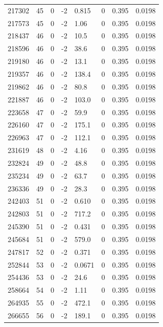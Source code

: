\documentclass[preview]{standalone}
\begin{document}
{{{{{{{{{\begin{tabular}{L{1.2cm}C{1.2cm} C{0.3cm}C{0.5cm} C{1.4cm}C{1.4cm} C{1.4cm}C{1.4cm}}
  217302  &    45  & 0     & -2 &  0.815  & 0  & 0.395 &  0.0198   \\ 
  217573  &    45  & 0     & -2 &  1.06  & 0  & 0.395 &  0.0198   \\ 
  218437  &    46  & 0     & -2 &  10.5  & 0  & 0.395 &  0.0198   \\ 
  218596  &    46  & 0     & -2 &  38.6  & 0  & 0.395 &  0.0198   \\ 
  219180  &    46  & 0     & -2 &  13.1  & 0  & 0.395 &  0.0198   \\ 
  219357  &    46  & 0     & -2 &  138.4  & 0  & 0.395 &  0.0198   \\ 
  219862  &    46  & 0     & -2 &  80.8  & 0  & 0.395 &  0.0198   \\ 
  221887  &    46  & 0     & -2 &  103.0  & 0  & 0.395 &  0.0198   \\ 
  223658  &    47  & 0     & -2 &  59.9  & 0  & 0.395 &  0.0198   \\ 
  226160  &    47  & 0     & -2 &  175.1  & 0  & 0.395 &  0.0198   \\ 
  226963  &    47  & 0     & -2 &  112.1  & 0  & 0.395 &  0.0198   \\ 
  231619  &    48  & 0     & -2 &  4.16  & 0  & 0.395 &  0.0198   \\ 
  232824  &    49  & 0     & -2 &  48.8  & 0  & 0.395 &  0.0198   \\ 
  235234  &    49  & 0     & -2 &  63.7  & 0  & 0.395 &  0.0198   \\ 
  236336  &    49  & 0     & -2 &  28.3  & 0  & 0.395 &  0.0198   \\ 
  242403  &    51  & 0     & -2 &  0.610  & 0  & 0.395 &  0.0198   \\ 
  242803  &    51  & 0     & -2 &  717.2  & 0  & 0.395 &  0.0198   \\ 
  245390  &    51  & 0     & -2 &  0.431  & 0  & 0.395 &  0.0198   \\ 
  245684  &    51  & 0     & -2 &  579.0  & 0  & 0.395 &  0.0198   \\ 
  247817  &    52  & 0     & -2 &  0.371  & 0  & 0.395 &  0.0198   \\ 
  252844  &    53  & 0     & -2 &  0.0671  & 0  & 0.395 &  0.0198   \\ 
  254436  &    53  & 0     & -2 &  24.6  & 0  & 0.395 &  0.0198   \\ 
  258664  &    54  & 0     & -2 &  1.11  & 0  & 0.395 &  0.0198   \\ 
  264935  &    55  & 0     & -2 &  472.1  & 0  & 0.395 &  0.0198   \\ 
  266655  &    56  & 0     & -2 &  189.1  & 0  & 0.395 &  0.0198   \\ 
\hline 
\end{tabular} 

}}}}}}}}}
\end{document}
